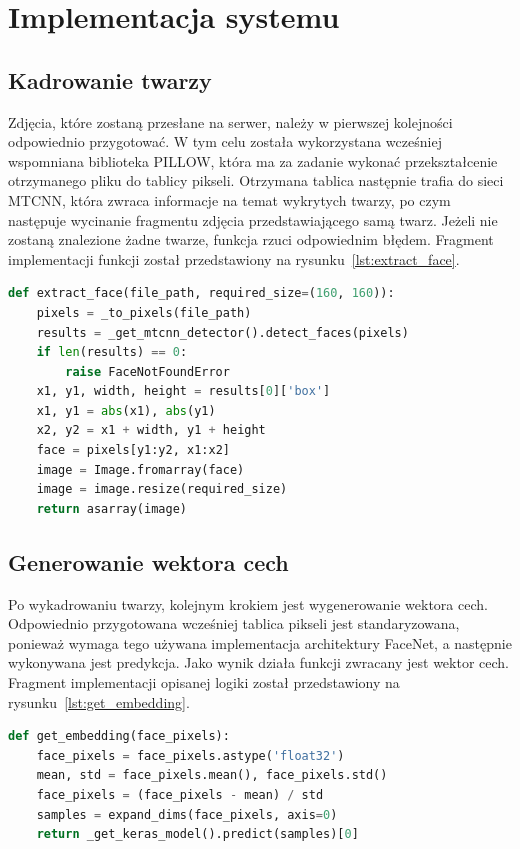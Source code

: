 \chapter{Implementacja systemu}


\section{Kadrowanie twarzy}

Zdjęcia, które zostaną przesłane na serwer, należy w pierwszej kolejności odpowiednio przygotować.
W tym celu została wykorzystana wcześniej wspomniana biblioteka PILLOW,
która ma za zadanie wykonać przekształcenie otrzymanego pliku do tablicy pikseli.
Otrzymana tablica następnie trafia do sieci MTCNN, która zwraca informacje na temat wykrytych twarzy,
po czym następuje wycinanie fragmentu zdjęcia przedstawiającego samą twarz.
Jeżeli nie zostaną znalezione żadne twarze, funkcja rzuci odpowiednim błędem.
Fragment implementacji funkcji został przedstawiony na rysunku~\ref{lst:extract_face}.

\begin{lstlisting}[language=Python, caption=Fragment implementacji funkcji do kadrowania twarzy,label={lst:extract_face}]
def extract_face(file_path, required_size=(160, 160)):
    pixels = _to_pixels(file_path)
    results = _get_mtcnn_detector().detect_faces(pixels)
    if len(results) == 0:
        raise FaceNotFoundError
    x1, y1, width, height = results[0]['box']
    x1, y1 = abs(x1), abs(y1)
    x2, y2 = x1 + width, y1 + height
    face = pixels[y1:y2, x1:x2]
    image = Image.fromarray(face)
    image = image.resize(required_size)
    return asarray(image)
\end{lstlisting}


\section{Generowanie wektora cech}

Po wykadrowaniu twarzy, kolejnym krokiem jest wygenerowanie wektora cech.
Odpowiednio przygotowana wcześniej tablica pikseli jest standaryzowana,
ponieważ wymaga tego używana implementacja architektury FaceNet, a następnie wykonywana jest predykcja.
Jako wynik działa funkcji zwracany jest wektor cech.
Fragment implementacji opisanej logiki został przedstawiony na rysunku~\ref{lst:get_embedding}.


\begin{lstlisting}[language=Python, caption=Implementacja funkcji do generowania wektora cech,label={lst:get_embedding}]
def get_embedding(face_pixels):
    face_pixels = face_pixels.astype('float32')
    mean, std = face_pixels.mean(), face_pixels.std()
    face_pixels = (face_pixels - mean) / std
    samples = expand_dims(face_pixels, axis=0)
    return _get_keras_model().predict(samples)[0]
\end{lstlisting}


